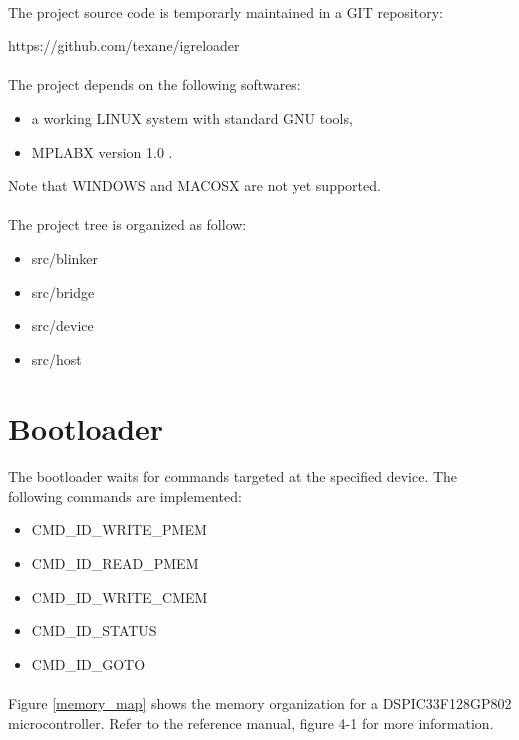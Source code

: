 \documentclass[a4paper, 11pt]{article}
\begin{document}
\paragraph{}
The project source code is temporarly maintained in a GIT repository:
\begin{center}
https://github.com/texane/igreloader
\end{center}

\paragraph{}
The project depends on the following softwares:
\begin{itemize}
\item a working LINUX system with standard GNU tools,
\item MPLABX version 1.0 .
\end{itemize}
Note that WINDOWS and MACOSX are not yet supported.

\paragraph{}
The project tree is organized as follow:
\begin{itemize}
\item src/blinker
\item src/bridge
\item src/device
\item src/host
\end{itemize}

\newpage
\section{Bootloader}
\paragraph{}
The bootloader waits for commands targeted at the specified device. The following commands are implemented:
\begin{itemize}
\item CMD\_ID\_WRITE\_PMEM
\item CMD\_ID\_READ\_PMEM
\item CMD\_ID\_WRITE\_CMEM
\item CMD\_ID\_STATUS
\item CMD\_ID\_GOTO
\end{itemize}

\paragraph{}
Figure \ref{memory_map} shows the memory organization for a DSPIC33F128GP802 microcontroller. Refer
to the reference manual, figure 4-1 for more information.
\end{document}
